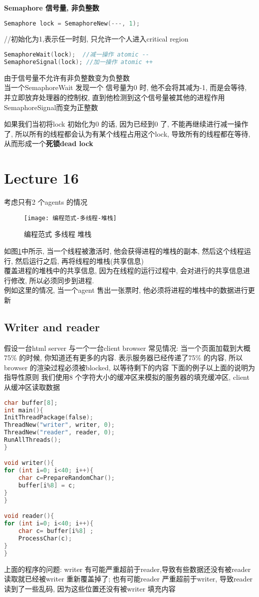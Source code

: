\documentclass{article}
\begin{document}
\textbf{Semaphore 信号量, 非负整数}
\begin{lstlisting}[language = C]
Semaphore lock = SemaphoreNew(---, 1);
\end{lstlisting}
//初始化为1,表示任一时刻, 只允许一个人进入critical region

\begin{lstlisting}[language = C]
SemaphoreWait(lock);  //减一操作 atomic --
SemaphoreSignal(lock); //加一操作 atomic ++
\end{lstlisting}
由于信号量不允许有非负整数变为负整数\\
当一个SemaphoreWait 发现一个 信号量为0 时, 他不会将其减为-1, 而是会等待, 并立即放弃处理器的控制权, 直到他检测到这个信号量被其他的进程作用SemaphoreSignal而变为正整数

如果我们当初将lock 初始化为0 的话, 因为已经到0 了, 不能再继续进行减一操作了, 所以所有的线程都会认为有某个线程占用这个lock, 导致所有的线程都在等待, 从而形成一个\textbf{死锁dead lock}

\section{Lecture 16}
考虑只有2 个agents 的情况
\begin{figure}[htbp]
	\centering
	\texttt{[image: 编程范式-多线程-堆栈]}\\
	\caption{编程范式 多线程 堆栈}\label{fig.编程范式.多线程.堆栈}
\end{figure}

如图\ref{fig.编程范式.多线程.堆栈}中所示, 当一个线程被激活时, 他会获得进程的堆栈的副本, 然后这个线程运行, 然后运行之后, 再将线程的堆栈(共享信息)\\覆盖进程的堆栈中的共享信息, 因为在线程的运行过程中, 会对进行的共享信息进行修改, 所以必须同步到进程.\\
例如这里的情况, 当一个agent 售出一张票时, 他必须将进程的堆栈中的数据进行更新\\

\subsection{Writer and reader}
假设一台html server 与一个一台client browser
常见情况: 当一个页面加载到大概75\% 的时候, 你知道还有更多的内容. 表示服务器已经传递了75\% 的内容, 所以browser 的渲染过程必须被blocked, 以等待剩下的内容
下面的例子以上面的说明为指导性原则
我们使用8 个字符大小的缓冲区来模拟的服务器的填充缓冲区, client 从缓冲区读取数据

\begin{lstlisting}[language = C]
char buffer[8];
int main(){
InitThreadPackage(false);
ThreadNew("writer", writer, 0);
ThreadNew("reader", reader, 0);
RunAllThreads();
}

void writer(){
for (int i=0; i<40; i++){
	char c=PrepareRandomChar();
	buffer[i%8] = c;
}
}

void reader(){
for (int i=0; i<40; i++){
	char c= buffer[i%8] ;
	ProcessChar(c);
}
}
\end{lstlisting}
上面的程序的问题: writer 有可能严重超前于reader,导致有些数据还没有被reader 读取就已经被writer 重新覆盖掉了; 也有可能reader 严重超前于writer, 导致reader 读到了一些乱码, 因为这些位置还没有被writer 填充内容
\end{document}
